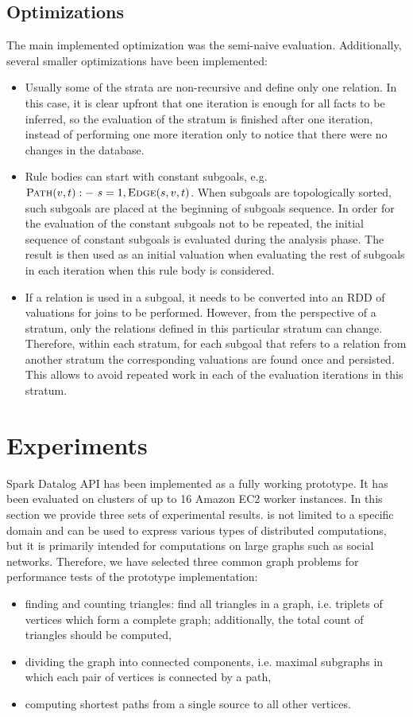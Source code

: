\subsection{Optimizations}
The main implemented optimization was the semi-naive evaluation. Additionally, several smaller optimizations have been implemented:
\begin{itemize}
\item Usually some of the strata are non-recursive and define only one relation. In this case, it is clear upfront that one iteration is enough for all facts to be inferred, so the evaluation of the stratum is finished after one iteration, instead of performing one more iteration only to notice that there were no changes in the database.
\item Rule bodies can start with constant subgoals, e.g. $\textsc{Path}(v,t) :-~s=1, \textsc{Edge}(s, v, t)$. When subgoals are topologically sorted, such subgoals are placed at the beginning of subgoals sequence. In order for the evaluation of the constant subgoals not to be repeated, the initial sequence of constant subgoals is evaluated during the analysis phase. The result is then used as an initial valuation when evaluating the rest of subgoals in each iteration when this rule body is considered.
\item If a relation is used in a subgoal, it needs to be converted into an RDD of valuations for joins to be performed. However, from the perspective of a stratum, only the relations defined in this particular stratum can change. Therefore, within each stratum, for each subgoal that refers to a relation from another stratum the corresponding valuations are found once and persisted. This allows to avoid repeated work in each of the evaluation iterations in this stratum.
\end{itemize}


\section{Experiments}\label{s:impl_eval}
Spark Datalog API has been implemented as a fully working prototype. It has been evaluated on clusters of up to 16 Amazon EC2 worker instances. In this section we provide three sets of experimental results. \datalogra is not limited to a specific domain and can be used to express various types of distributed computations, but it is primarily intended for computations on large graphs such as social networks. Therefore, we have selected three common graph problems \cite{ullman, pregel} for performance tests of the prototype implementation: 
\begin{itemize}
\item finding and counting triangles: find all triangles in a graph, i.e. triplets of vertices which form a complete graph; additionally, the total count of triangles should be computed,
\item dividing the graph into connected components, i.e. maximal subgraphs in which each pair of vertices is connected by a path,
\item computing shortest paths from a single source to all other vertices.
\end{itemize}

